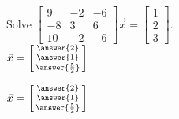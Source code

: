 \documentclass{ximera}
\begin{document}
\begin{exercise}
    Solve
    $\left[ 
        \begin{smallmatrix}
            9 & -2 & -6 \\
            -8 & 3 & 6 \\
            10 & -2 & -6
        \end{smallmatrix} 
    \right] 
    \vec{x} =
    \left[ 
        \begin{smallmatrix}
            1 \\
            2 \\
            3
        \end{smallmatrix} 
    \right]$.\\
    $\vec{x} = \left[\begin{smallmatrix} \answer{2} \\ \answer{1} \\ \answer{\frac{5}{2}} \end{smallmatrix}\right]$
    \begin{multipleChoice}
    \end{multipleChoice}
    \begin{problem}
        $\vec{x} = \left[\begin{smallmatrix} \answer{2} \\ \answer{1} \\ \answer{\frac{5}{2}} \end{smallmatrix}\right]$
    \end{problem}
\end{exercise}
\end{document}
